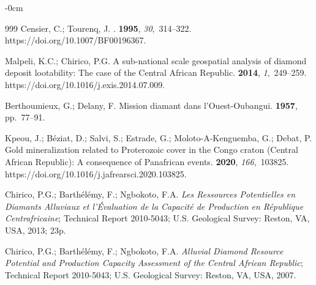\documentclass[minerals,article,accept,pdftex,moreauthors]{Definitions/mdpi}
\begin{document}
\begin{adjustwidth}{-\extralength}{0cm}
\begin{thebibliography}{999}
Censier, C.; Tourenq, J.
.
 {\bf 1995}, {\em 30},~314--322.
\newblock https://doi.org/10.1007/BF00196367.

Malpeli, K.C.; Chirico, P.G.
\newblock A sub-national scale geospatial analysis of diamond deposit
  lootability: The case of the Central African Republic.
 {\bf 2014}, {\em
  1},~249--259.
\newblock https://doi.org/10.1016/j.exis.2014.07.009.

Berthoumieux, G.; Delany, F.
\newblock Mission diamant dans l'Ouest-Oubangui.
 {\bf 1957},
  pp.~77--91.

Kpeou, J.; Béziat, D.; Salvi, S.; Estrade, G.; Moloto-A-Kenguemba, G.; Debat,
  P.
\newblock Gold mineralization related to Proterozoic cover in the Congo craton
  (Central African Republic): A consequence of Panafrican events.
 {\bf 2020}, {\em
  166},~103825.
\newblock https://doi.org/10.1016/j.jafrearsci.2020.103825.

Chirico, P.G.; Barthélémy, F.; Ngbokoto, F.A.
\newblock \emph{Les Ressources Potentielles en Diamants Alluviaux et l’Évaluation
  de la Capacité de Production en République Centrafricaine};
\newblock Technical Report 2010-5043; %
  U.S. Geological Survey: Reston, VA, USA, 2013; 23p. %

Chirico, P.G.; Barthélémy, F.; Ngbokoto, F.A.
\newblock \emph{Alluvial Diamond Resource Potential and Production Capacity
  Assessment of the Central African Republic};
\newblock Technical Report 2010-5043; %
  U.S. Geological Survey: Reston, VA, USA, 2007. %
\newblock 


\end{thebibliography}
\end{adjustwidth}
\end{document}
